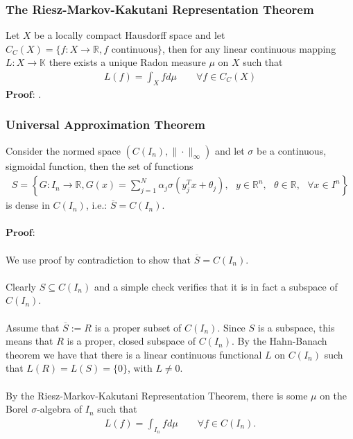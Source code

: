 \documentclass{article}
\theoremstyle{definition}
\begin{document}
\subsubsection{The Riesz-Markov-Kakutani Representation Theorem}
Let $X$ be a locally compact Hausdorff space and let $C_{C}(X) =\{f: X\rightarrow \mathbb{R}, f \text{  continuous}\}$, then for any linear continuous mapping $L:X\rightarrow \mathbb{K}$ there exists a unique Radon measure $\mu$ on $X$ such that
\begin{align}
    L(f) = \int_X f d\mu \qquad \forall f \in C_C(X)
\end{align}
$\textbf{Proof}$: \cite{espejo2023riesz}.

\subsubsection{Universal Approximation Theorem}
Consider the normed space $(C(I_n), \|\cdot\|_{\infty})$ and let $\sigma$ be a continuous, sigmoidal function, then the set of functions
\begin{align*}
    S = \left\{G:I_n \rightarrow \mathbb{R}, G(x) = \sum_{j=1}^N \alpha_j \sigma(y_j^T x + \theta_j), \text{ } y \in \mathbb{R}^n, \text{ }\theta \in \mathbb{R},\text{ } \forall x \in I^n \right\}
\end{align*}
is dense in $C(I_n)$, i.e.: $\overline{S}=C(I_n)$.\\\\
$\textbf{Proof}$:\\\\
We use proof by contradiction to show that $\overline{S}=C(I_n)$. \\\\
Clearly $S\subseteq C(I_n)$ and a simple check verifies that it is in fact a subspace of $C(I_n)$.\\\\
Assume that $\overline{S} := R$ is a proper subset of $C(I_n)$. Since $S$ is a subspace, this means that $R$ is a proper, closed subspace of $C(I_n)$. By the Hahn-Banach theorem we have that there is a linear continuous functional $L$ on $C(I_n)$ such that $L(R) = L(S) = \{0\}$, with $L \neq 0$.\\\\
By the Riesz-Markov-Kakutani Representation Theorem, there is some $\mu$ on the Borel $\sigma$-algebra of $I_n$ such that
\begin{align*}
    L(f) = \int_{I_n} f d\mu \qquad \forall f \in C(I_n).
\end{align*}
\end{document}
